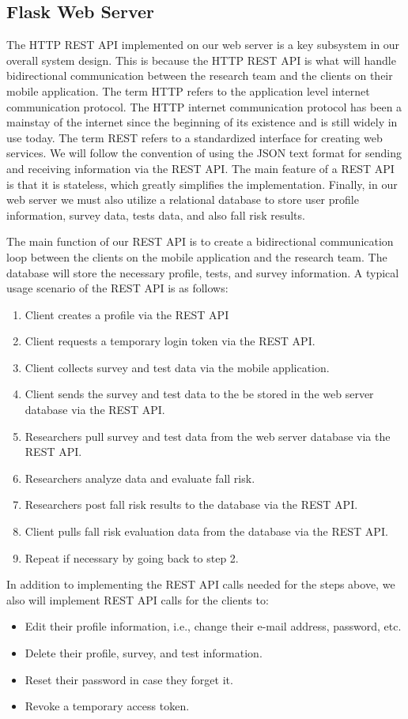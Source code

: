 \documentclass[conference]{IEEEtran}
\begin{document}
\subsection{Flask Web Server}

The HTTP REST API implemented on our web server is a key subsystem in our overall system design. This is because the HTTP REST API is what will handle bidirectional communication between the research team and the clients on their mobile application. The term HTTP refers to the application level internet communication protocol. The HTTP internet communication protocol has been a mainstay of the internet since the beginning of its existence and is still widely in use today. The term REST refers to a standardized interface for creating web services. We will follow the convention of using the JSON text format for sending and receiving information via the REST API. The main feature of a REST API is that it is stateless, which greatly simplifies the implementation. Finally, in our web server we must also utilize a relational database to store user profile information, survey data, tests data, and also fall risk results.

The main function of our REST API is to create a bidirectional communication loop between the clients on the mobile application and the research team. The database will store the necessary profile, tests, and survey information. A typical usage scenario of the REST API is as follows:
\begin{enumerate}
\item Client creates a profile via the REST API
\item Client requests a temporary login token via the REST API.
\item Client collects survey and test data via the mobile application.
\item Client sends the survey and test data to the be stored in the web server database via the REST API.
\item Researchers pull survey and test data from the web server database via the REST API.
\item Researchers analyze data and evaluate fall risk.
\item Researchers post fall risk results to the database via the REST API.
\item Client pulls fall risk evaluation data from the database via the REST API.
\item Repeat if necessary by going back to step 2.
\end{enumerate}
In addition to implementing the REST API calls needed for the steps above, we also will implement REST API calls for the clients to:
\begin{itemize}
\item Edit their profile information, i.e., change their e-mail address, password, etc.
\item Delete their profile, survey, and test information.
\item Reset their password in case they forget it.
\item Revoke a temporary access token.
\end{itemize}
\end{document}
